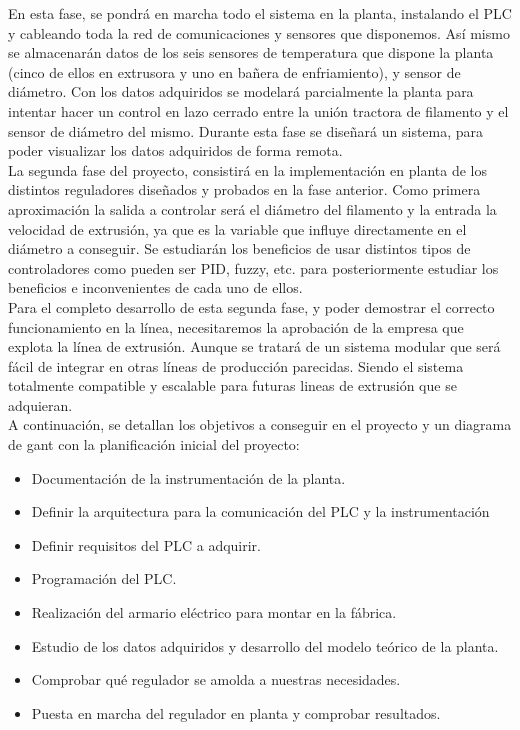 En esta fase, se pondrá en marcha todo el sistema en la planta, instalando el PLC y cableando toda la red de comunicaciones y sensores que disponemos. Así mismo se almacenarán datos de los seis sensores de temperatura que dispone la planta (cinco de ellos en extrusora y uno en bañera de enfriamiento), y sensor de diámetro. Con los datos adquiridos se modelará parcialmente la planta para intentar hacer un control en lazo cerrado entre la unión tractora de filamento y el sensor de diámetro del mismo. Durante esta fase se diseñará un sistema, para poder visualizar los datos adquiridos de forma remota.\\

La segunda fase del proyecto, consistirá en la implementación en planta de los distintos reguladores diseñados y probados en la fase anterior. Como primera aproximación la salida a controlar será el diámetro del filamento y la entrada la velocidad de extrusión, ya que es la variable que influye directamente en el diámetro a conseguir. Se estudiarán los beneficios de usar distintos tipos de controladores como pueden ser PID, fuzzy, etc. para posteriormente estudiar los beneficios e inconvenientes de cada uno de ellos.\\

Para el completo desarrollo de esta segunda fase, y poder demostrar el correcto funcionamiento en la línea, necesitaremos la aprobación de la empresa que explota la línea de extrusión. Aunque se tratará de un sistema modular que será fácil de integrar en otras líneas de producción parecidas. Siendo el sistema totalmente compatible y escalable para futuras lineas de extrusión que se adquieran.\\

A continuación, se detallan los objetivos a conseguir en el proyecto y un diagrama de gant con la planificación inicial del proyecto:

\begin{itemize}
	\item Documentación de la instrumentación de la planta.
	\item Definir la arquitectura para la comunicación del PLC y la instrumentación
	\item Definir requisitos del PLC a adquirir.
	\item Programación del PLC.
	\item Realización del armario eléctrico para montar en la fábrica.
	\item Estudio de los datos adquiridos y desarrollo del modelo teórico de la planta.
	\item Comprobar qué regulador se amolda a nuestras necesidades.
	\item Puesta en marcha del regulador en planta y comprobar resultados.
\end{itemize}
\label{Listado_objetivos}
